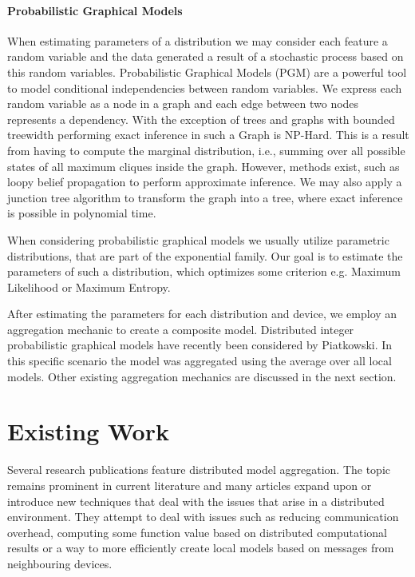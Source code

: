   \paragraph{Probabilistic Graphical Models}  


  When estimating parameters of a distribution we may consider each feature a random variable and the data generated a result of a stochastic process based on this random variables.
  Probabilistic Graphical Models (PGM) are a powerful tool to model conditional independencies between random variables. 
  We express each random variable as a node in a graph and each edge between two nodes represents a dependency. 
  With the exception of trees and graphs with bounded treewidth performing exact inference in such a Graph is NP-Hard.
  This is a result from having to compute the marginal distribution, i.e., summing over all possible states of all maximum cliques inside the graph.
  However, methods exist, such as loopy belief propagation to perform approximate inference.
  We may also apply a junction tree algorithm to transform the graph into a tree, where exact inference is possible in polynomial time.
    
  When considering probabilistic graphical models we usually utilize parametric distributions, that are part of the exponential family. 
  Our goal is to estimate the parameters of such a distribution, which optimizes some criterion e.g. Maximum Likelihood or Maximum Entropy.
  

  After estimating the parameters for each distribution and device, we employ an aggregation mechanic to create a composite model.
  Distributed integer probabilistic graphical models \cite{piatkowskidistributed} have recently been considered by Piatkowski.
  In this specific scenario the model was aggregated using the average over all local models.
  Other existing aggregation mechanics are discussed in the next section.

    \section{Existing Work}
    \label{sec:ew}
    Several research publications feature  distributed model aggregation.
    The topic remains prominent in current literature and many articles expand upon or introduce new techniques that deal with the issues that arise in a distributed environment.
    They attempt to deal with issues such as reducing communication overhead, computing some function value based on distributed computational results or a way to more efficiently create local models based on messages from neighbouring devices. 

